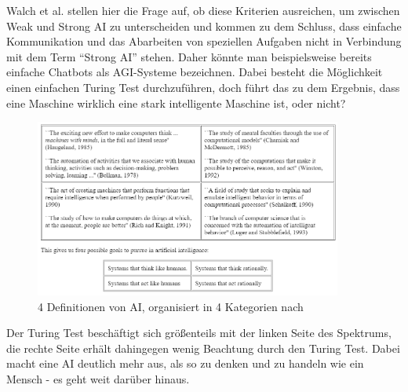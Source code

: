             Walch et al. stellen hier die Frage auf, ob diese Kriterien ausreichen, um zwischen Weak und Strong AI
            zu unterscheiden und kommen zu dem Schluss, dass einfache Kommunikation und das Abarbeiten von
            speziellen Aufgaben nicht in Verbindung mit dem Term ``Strong AI'' stehen. Daher könnte man beispielsweise
            bereits einfache Chatbots als AGI-Systeme bezeichnen. \cite{walch_world_2019} Dabei besteht die
            Möglichkeit einen einfachen Turing Test durchzuführen, doch führt das zu dem Ergebnis, dass eine
            Maschine wirklich eine stark intelligente Maschine ist, oder nicht?
            \begin{figure}[h]
                \begin{center}
                    \includegraphics[width=0.9\textwidth]{figures/ai-definitions.png}
                    \caption[4 Definitionen AI]{4 Definitionen von AI, organisiert in 4 Kategorien nach \cite{russell}}
                    \label{pic:ai-definitions}
                \end{center}
            \end{figure}
            Der Turing Test beschäftigt sich größenteils mit der linken Seite des Spektrums, die rechte Seite erhält
            dahingegen wenig Beachtung durch den Turing Test. Dabei macht eine AI deutlich mehr aus, als so zu denken
            und zu handeln wie ein Mensch - es geht weit darüber hinaus.


